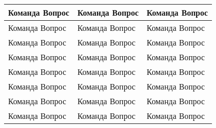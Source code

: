
\usepackage{multicol}
\usepackage{tabularx}
\newdimen{\blankheight}
\newdimen{\blankwidth}
\newcommand{\cell}{\vspace{-0.5em}\hspace{0.5em} Команда \makebox[2em]{\hrulefill}\hspace{\blankwidth} Вопрос \arabic{Questions}\stepcounter{Questions} \vspace{\blankheight}}
\newcommand{\cellx}{\vspace{-0.5em}\hspace{0.5em} Команда \makebox[2em]{\hrulefill}\hspace{\blankwidth} Вопрос \makebox[2em]{\hrulefill} \vspace{\blankheight}}

\begin{tabularx}{\textwidth}{>{\raggedright\arraybackslash}X|>{\raggedright\arraybackslash}X|>{\raggedright\arraybackslash}X}
\cellx & \cellx & \cellx \\ \hline
\cellx & \cellx & \cellx \\ \hline
\cellx & \cellx & \cellx \\ \hline
\cellx & \cellx & \cellx \\ \hline
\cellx & \cellx & \cellx \\ \hline
\cellx & \cellx & \cellx \\ \hline
\cellx & \cellx & \cellx \\ \hline
\cellx & \cellx & \cellx \\ \hline
\end{tabularx}
